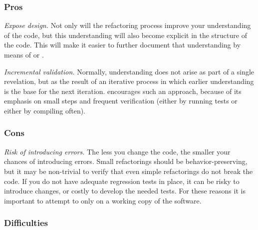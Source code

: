 \documentclass[a4paper,10pt,twoside]{book}
\begin{document}
\subsubsection*{Pros}

\begin{bulletlist}
\item \emph{Expose design.}
Not only will the refactoring process improve your understanding of the code, but this understanding will also become explicit in the structure of the code. This will make it easier to further document that understanding by means of  or .

\item \emph{Incremental validation.}
Normally, understanding does not arise as part of a single revelation, but as the result of an iterative process in which earlier understanding is the base for the next iteration.  encourages such an approach, because of its emphasis on small steps and frequent verification (either by running tests or either by compiling often).
\end{bulletlist}

\subsubsection*{Cons}

\begin{bulletlist}
\item \emph{Risk of introducing errors.}
The less you change the code, the smaller your chances of introducing errors. Small refactorings should be behavior-preserving, but it may be non-trivial to verify that even simple refactorings do not break the code. If you do not have adequate regression tests in place, it can be risky to introduce changes, or costly to develop the needed tests. For these reasons it is important to attempt to  only on a working copy of the software.
\end{bulletlist}

\subsubsection*{Difficulties}
\end{document}
